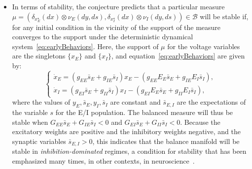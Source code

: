 \documentclass[onefignum,onetabnum]{siamart190516}
\newcommand{\1}{\mathbbm{1}}
\newcommand{\B}{\mathcal{B}}
\newcommand{\review}[1]{\textcolor{midblue}{ #1}}
\renewcommand{\review}[1]{{ #1}}
\begin{document}
\begin{itemize}
	\item \review{In terms of stability, the conjecture predicts that a particular measure $\mu=(\delta_{x_E^\star}(dx)\otimes \nu_E(dy,ds),\delta_{x_I^\star}(dx)\otimes \nu_I(dy,ds))\in \B$ will be stable if, for any initial condition in the vicinity of the support of the measure converges to the support under the deterministic dynamical system~\eqref{eq:earlyBehaviors}. Here, the support of $\mu$ for the voltage variables are the singletons $\{x_E\}$ and $\{x_I\}$, and equation~\eqref{eq:earlyBehaviors} are given by:
	\begin{equation}
	\begin{cases}
		\dot{x}_E= (g_{EE} \bar{s}_E+g_{IE} \bar{s}_I)x_E - (g_{EE}E_E\bar{s}_E + g_{IE}E_I\bar{s}_I),\\
		\dot{x}_I = (g_{EI} \bar{s}_E+g_{II} \bar{s}_I)x_I - (g_{EI}E_E\bar{s}_E + g_{II}E_I\bar{s}_I),
		\end{cases}
	\end{equation}
	where the values of $y_E, \bar{s}_E, y_I, \bar{s}_I$ are constant and $\bar{s}_{E,I}$ are the expectations of the variable $s$ for the E/I population. The balanced measure will thus be stable when $G_{EE} \bar{s}_E+G_{IE} \bar{s}_I<0$ and $G_{EI} \bar{s}_E+G_{II} \bar{s}_I<0$. Because the excitatory weights are positive and the inhibitory weights negative, and the synaptic variables $\bar{s}_{E,I}>0$, this indicates that the balance manifold will be stable in \emph{inhibition-dominated} regimes, a condition for stability that has been emphasized many times, in other contexts, in neuroscience~\cite{tartaglia2017bistability,sadeh2021inhibitory,ahmadian2021dynamical}. }
\end{itemize}
\end{document}
